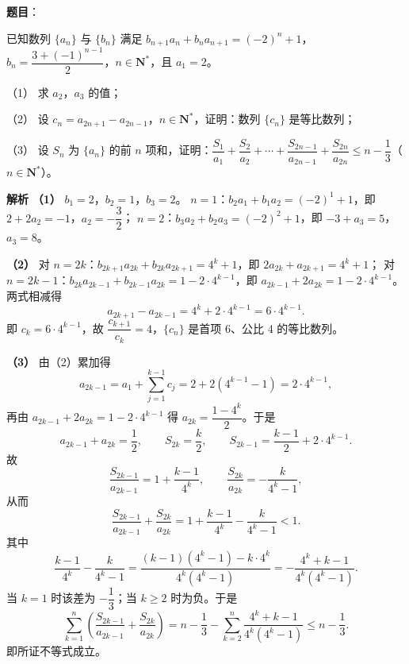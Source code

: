 \begin{answer}

\textbf{题目}：

已知数列 $\{a_n\}$ 与 $\{b_n\}$ 满足 $b_{n+1}a_n+b_na_{n+1}=(-2)^n+1$，$b_n=\dfrac{3+(-1)^{n-1}}2$，$n\in\mathbf N^*$，且 $a_1=2$。

（1） 求 $a_2$，$a_3$ 的值；

（2） 设 $c_n=a_{2n+1}-a_{2n-1}$，$n\in\mathbf N^*$，证明：数列 $\{c_n\}$ 是等比数列；

（3） 设 $S_n$ 为 $\{a_n\}$ 的前 $n$ 项和，证明：$\dfrac{S_1}{a_1}+\dfrac{S_2}{a_2}+\cdots+\dfrac{S_{2n-1}}{a_{2n-1}}+\dfrac{S_{2n}}{a_{2n}}\leqslant n-\dfrac13$（$n\in\mathbf N^*$）。

\clearpage

\textbf{解析}
\textbf{（1）} $b_1=2$，$b_2=1$，$b_3=2$。
$n=1$：$b_2a_1+b_1a_2=(-2)^1+1$，即 $2+2a_2=-1$，$a_2=-\dfrac32$；
$n=2$：$b_3a_2+b_2a_3=(-2)^2+1$，即 $-3+a_3=5$，$a_3=8$。

\textbf{（2）} 对 $n=2k$：$b_{2k+1}a_{2k}+b_{2k}a_{2k+1}=4^k+1$，即 $2a_{2k}+a_{2k+1}=4^k+1$；
对 $n=2k-1$：$b_{2k}a_{2k-1}+b_{2k-1}a_{2k}=1-2\cdot4^{k-1}$，即 $a_{2k-1}+2a_{2k}=1-2\cdot4^{k-1}$。
两式相减得
\nopagebreak[4]
\[a_{2k+1}-a_{2k-1}=4^k+2\cdot4^{k-1}=6\cdot4^{k-1}.\]
即 $c_k=6\cdot4^{k-1}$，故 $\dfrac{c_{k+1}}{c_k}=4$，$\{c_n\}$ 是首项 $6$、公比 $4$ 的等比数列。

\textbf{（3）} 由（2）累加得
\nopagebreak[4]
\[a_{2k-1}=a_1+\sum_{j=1}^{k-1}c_j=2+2(4^{k-1}-1)=2\cdot4^{k-1},\]
再由 $a_{2k-1}+2a_{2k}=1-2\cdot4^{k-1}$ 得 $a_{2k}=\dfrac{1-4^k}2$。于是
\nopagebreak[4]
\[a_{2k-1}+a_{2k}=\frac12,\qquad S_{2k}=\frac k2,\qquad S_{2k-1}=\frac{k-1}2+2\cdot4^{k-1}.\]
故
\nopagebreak[4]
\[\frac{S_{2k-1}}{a_{2k-1}}=1+\frac{k-1}{4^k},\qquad \frac{S_{2k}}{a_{2k}}=-\frac{k}{4^k-1},\]
从而
\nopagebreak[4]
\[\frac{S_{2k-1}}{a_{2k-1}}+\frac{S_{2k}}{a_{2k}}=1+\frac{k-1}{4^k}-\frac{k}{4^k-1}<1.\]
其中
\nopagebreak[4]
\[\frac{k-1}{4^k}-\frac{k}{4^k-1}=\frac{(k-1)(4^k-1)-k\cdot4^k}{4^k(4^k-1)}=-\frac{4^k+k-1}{4^k(4^k-1)}.\]
当 $k=1$ 时该差为 $-\dfrac13$；当 $k\geqslant2$ 时为负。于是
\nopagebreak[4]
\[\sum_{k=1}^{n}\left(\frac{S_{2k-1}}{a_{2k-1}}+\frac{S_{2k}}{a_{2k}}\right)=n-\frac13-\sum_{k=2}^{n}\frac{4^k+k-1}{4^k(4^k-1)}\leqslant n-\frac13.\]
即所证不等式成立。




\end{answer}